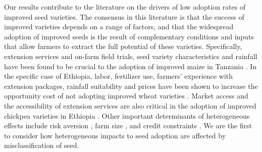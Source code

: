 \documentclass[11pt]{article}
\begin{document}



Our results contribute to the literature on the drivers of low adoption rates of improved seed varieties. The consensus in this literature is that the success of improved varieties depends on a range of factors, and that the widespread adoption of  improved seeds is the result of complementary conditions and inputs that allow farmers to extract the full potential of these varieties. Specifically, extension services and on-farm field trials, seed variety characteristics and rainfall have been found to be crucial to the adoption of improved maize in Tanzania \citep{Kaliba2000-jh}. In the specific case of Ethiopia, labor, fertilizer use, farmers’ experience with extension packages, rainfall suitability and prices have been shown to increase the opportunity cost of not adopting improved wheat varieties \citep{Wale2006-bv}. Market access and the accessibility of extension services are also critical in the adoption of improved chickpea varieties in Ethiopia \citep{Verkaart2019-ol}. Other important determinants of heterogeneous effects include risk aversion \citep{Holden2016-vy}, farm size \citep{Ghimire2015-bd}, and credit constraints \citep{Simtowe2008-jn,Balana2020-hx}. We are the first to consider how heterogeneous impacts to seed adoption are affected by misclassification of seed.

\end{document}
